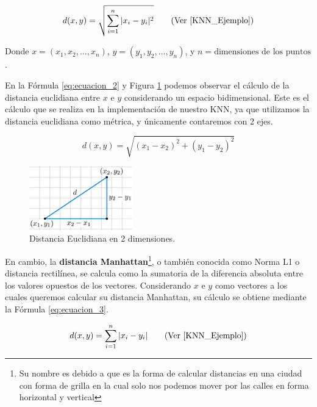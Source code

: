 \documentclass[12pt,a4paper]{article}
\begin{document}
\begin{sloppypar}
\begin{equation}\label{eq:ecuacion_1}
d(x,y)=\sqrt{\sum_{i=1}^{n}|x_{i}-y_{i}|^2}   \qquad  \text{(Ver \cite{KNN_Ejemplo})}
\end{equation}

Donde $x=(x_{1},x_{2},..., x_{n})$, $y = (y_{1},y_{2},...,y_{n})$, y $n = \text{dimensiones de los puntos}$.

En la Fórmula \ref{eq:ecuacion_2} y Figura \ref{fig:KNN_2_Dim} podemos observar el cálculo de la distancia euclidiana entre $x$ e $y$ considerando un espacio bidimensional. Este es el cálculo que se realiza en la implementación de nuestro KNN, ya que utilizamos la distancia euclidiana como métrica, y únicamente contaremos con 2 ejes.

\begin{equation}\label{eq:ecuacion_2}
d(x,y)=\sqrt{(x_{1}-x_{2})^2 + (y_{1}-y_{2})^2}
\end{equation}

\begin{figure}[H]    %
 \centering
 \includegraphics[width=0.4\textwidth]{images/KNN_2_Dim.png}
 \captionsetup{justification=centering,margin=2cm}
 \caption{Distancia Euclidiana en 2 dimensiones.} 
 \label{fig:KNN_2_Dim}
\end{figure}

En cambio, la \textbf{distancia Manhattan}\footnote{Su nombre es debido a que es la forma de calcular distancias en una ciudad con forma de grilla en la cual solo nos podemos mover por las calles en forma horizontal y vertical}, o también conocida como Norma L1 o distancia rectilínea, se calcula como la sumatoria de la diferencia absoluta entre los valores opuestos de los vectores. Considerando $x$ e $y$ como vectores a los cuales queremos calcular su distancia Manhattan, su cálculo se obtiene mediante la Fórmula \ref{eq:ecuacion_3}.

\begin{equation}\label{eq:ecuacion_3}
d(x,y)=\sum_{i=1}^{n}|x_{i}-y_{i}|  \qquad  \text{(Ver \cite{KNN_Ejemplo})}
\end{equation}


\end{sloppypar}
\end{document}
